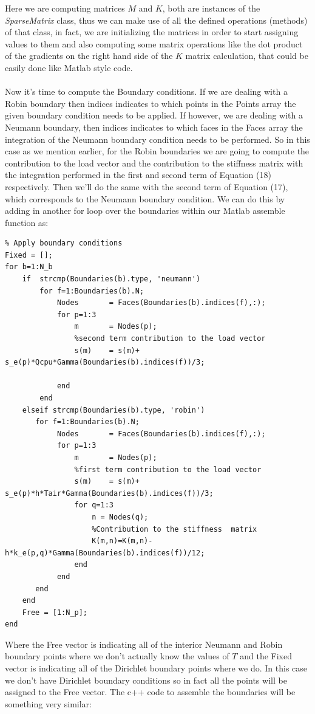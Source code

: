 \documentclass[12pt]{article}
\begin{document}
Here we are computing matrices $M$ and $K$, both are instances of the \textit{SparseMatrix} class, thus we can make use of all the defined operations (methods) of that class, in fact, we are initializing the matrices in order to start assigning values to them and also computing some matrix operations like the dot product of the gradients on the right hand side of the $K$ matrix calculation, that could be easily done like Matlab style code.
\\\\
Now it's time to compute the Boundary conditions. If we are dealing with a Robin boundary then indices indicates to which points in the Points array the given boundary condition needs to be applied. If however, we are dealing with a Neumann boundary, then indices indicates to which faces in the Faces array the integration of the Neumann boundary condition needs to be performed. So in this case as we mention earlier, for the Robin boundaries we are going to compute the contribution to the load vector and the contribution to the stiffness matrix with the integration performed in the first and second term of Equation (18) respectively. Then we'll do the same with the second term of Equation (17), which corresponds to the Neumann boundary condition. We can do this by adding in another for loop over the boundaries within our Matlab assemble function as:

\begin{lstlisting}
% Apply boundary conditions
Fixed = [];
for b=1:N_b  
	if  strcmp(Boundaries(b).type, 'neumann')
		for f=1:Boundaries(b).N;
			Nodes       = Faces(Boundaries(b).indices(f),:);
			for p=1:3
				m     	= Nodes(p);
				%second term contribution to the load vector
				s(m)	= s(m)+ s_e(p)*Qcpu*Gamma(Boundaries(b).indices(f))/3; 
				
			end
		end        
	elseif strcmp(Boundaries(b).type, 'robin')
	   for f=1:Boundaries(b).N;
			Nodes       = Faces(Boundaries(b).indices(f),:);
			for p=1:3
				m     	= Nodes(p);
				%first term contribution to the load vector
				s(m)	= s(m)+ s_e(p)*h*Tair*Gamma(Boundaries(b).indices(f))/3; 
				for q=1:3
					n = Nodes(q);
					%Contribution to the stiffness  matrix
					K(m,n)=K(m,n)-h*k_e(p,q)*Gamma(Boundaries(b).indices(f))/12; 
				end
			end
	   end
	end
	Free = [1:N_p];
end
\end{lstlisting}

Where the Free vector is indicating all of the interior Neumann and Robin boundary points where we don't actually know the values of $T$ and the Fixed vector is indicating all of the Dirichlet boundary points where we do. In this case we don't have Dirichlet boundary conditions so in fact all the points will be assigned to the Free vector. The c++ code to assemble the boundaries will be something very similar:
\end{document}
